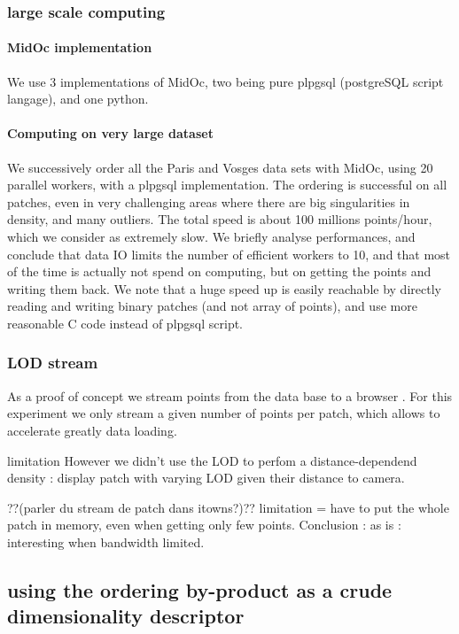 		\subsubsection{large scale computing}
		
			\paragraph{MidOc implementation} 
				We use 3 implementations of MidOc, two being pure plpgsql (postgreSQL script langage), and one python.
			\paragraph{Computing on very large dataset}
				We successively order all the Paris and Vosges data sets with MidOc, using 20 parallel workers, with a plpgsql implementation.
				The ordering is successful on all patches, even in very challenging areas where there are big singularities in density, and many outliers.
				The total speed is about 100 millions points/hour, which we consider as extremely slow.
				We briefly analyse performances, and conclude that data IO limits the number of efficient workers to 10, and that most of the time is actually not spend on computing, but on getting the points and writing them back.
				We note that a huge speed up is easily reachable by directly reading and writing binary patches (and not array of points), and use more reasonable C code instead of plpgsql script.
				
		\subsubsection{LOD stream}
			As a proof of concept we stream points from the data base to a browser .
			For this experiment we only stream a given number of points per patch, which allows to accelerate greatly data loading.
			
			
			limitation
			However we didn't use the LOD to perfom a distance-dependend density :  display patch with varying LOD given their distance to camera.
			
			??(parler du stream de patch dans itowns?)??
			limitation = have to put the whole patch in memory, even when getting only few points.
			Conclusion : as is : interesting when bandwidth limited.  
			
			
	\subsection{using the ordering by-product as a crude dimensionality descriptor}
